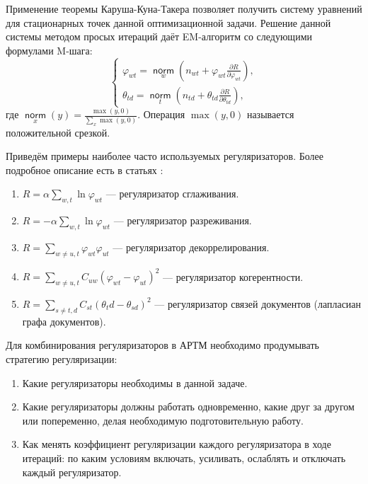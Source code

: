 \documentclass[12pt]{article}
\renewcommand{\phi}{\varphi}
\newcommand{\norm}{\mathop{\mathsf{norm}}\limits}
\begin{document}
Применение теоремы Каруша-Куна-Такера позволяет получить систему уравнений для стационарных точек данной оптимизационной задачи. Решение данной системы методом просых итераций даёт EM-алгоритм со следующими формулами M-шага:
\[
\left\{
	\begin{aligned}
\phi_{wt} = \norm_w  \left(n_{wt} + \phi_{wt}\frac{\partial R}{\partial\phi_{wt}}\right),\\
\theta_{td} = \norm_t  \left(n_{td} + \theta_{td}\frac{\partial R}{\partial\theta_{td}}\right),
	\end{aligned}
\right.
\]
где $\norm_x(y) = \frac{\max(y, 0)}{\sum\limits_x \max(y, 0)}$. Операция $\max(y, 0)$ называется положительной срезкой.

Приведём примеры наиболее часто используемых регуляризаторов. Более подробное описание есть в статьях \cite{artmdef1, artmdef2, artmdef3}:
\begin{enumerate}
\item $R = \alpha \sum\limits_{w, t} \ln \phi_{wt}$ --- регуляризатор сглаживания.
\item $R = -\alpha \sum\limits_{w, t} \ln \phi_{wt}$ --- регуляризатор разреживания.
\item $R = \sum\limits_{w \neq u, t} \phi_{wt} \phi_{ut}$ --- регуляризатор декоррелирования.
\item $R = \sum\limits_{w \neq u, t} C_{uw}\left( \phi_{wt}  - \phi_{ut} \right)^2$ --- регуляризатор когерентности.
\item $R = \sum\limits_{s \neq t, d} C_{st}\left( \theta_td  - \theta_{sd} \right)^2$ --- регуляризатор связей документов (лапласиан графа документов).
\end{enumerate}

Для комбинирования регуляризаторов в АРТМ необходимо продумывать стратегию регуляризации:
\begin{enumerate}
\item Какие регуляризаторы необходимы в данной задаче.
\item Какие регуляризаторы должны работать одновременно, какие друг за другом или попеременно, делая необходимую подготовительную работу.
\item Как менять коэффициент регуляризации каждого регуляризатора в ходе итераций: по каким условиям включать, усиливать, ослаблять и отключать каждый регуляризатор.
\end{enumerate}
\end{document}
